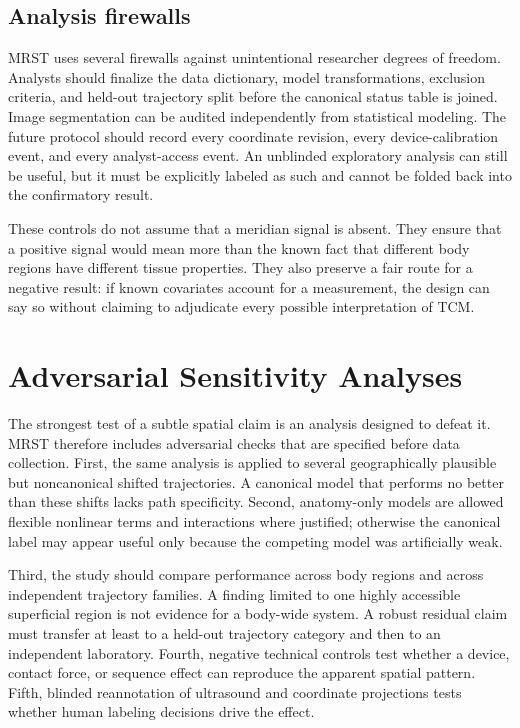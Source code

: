 \documentclass[conference]{IEEEtran}
\begin{document}
\subsection{Analysis firewalls}

MRST uses several firewalls against unintentional researcher degrees of freedom. Analysts should finalize the data dictionary, model transformations, exclusion criteria, and held-out trajectory split before the canonical status table is joined. Image segmentation can be audited independently from statistical modeling. The future protocol should record every coordinate revision, every device-calibration event, and every analyst-access event. An unblinded exploratory analysis can still be useful, but it must be explicitly labeled as such and cannot be folded back into the confirmatory result.

These controls do not assume that a meridian signal is absent. They ensure that a positive signal would mean more than the known fact that different body regions have different tissue properties. They also preserve a fair route for a negative result: if known covariates account for a measurement, the design can say so without claiming to adjudicate every possible interpretation of TCM.

\section{Adversarial Sensitivity Analyses}

The strongest test of a subtle spatial claim is an analysis designed to defeat it. MRST therefore includes adversarial checks that are specified before data collection. First, the same analysis is applied to several geographically plausible but noncanonical shifted trajectories. A canonical model that performs no better than these shifts lacks path specificity. Second, anatomy-only models are allowed flexible nonlinear terms and interactions where justified; otherwise the canonical label may appear useful only because the competing model was artificially weak.

Third, the study should compare performance across body regions and across independent trajectory families. A finding limited to one highly accessible superficial region is not evidence for a body-wide system. A robust residual claim must transfer at least to a held-out trajectory category and then to an independent laboratory. Fourth, negative technical controls test whether a device, contact force, or sequence effect can reproduce the apparent spatial pattern. Fifth, blinded reannotation of ultrasound and coordinate projections tests whether human labeling decisions drive the effect.
\end{document}
